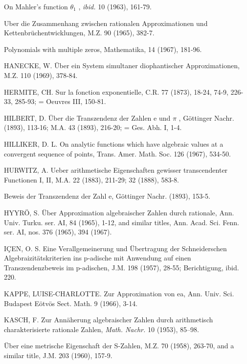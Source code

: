 \begin{hanglist}
    \item \hspace{1.5em} On Mahler's function  $\theta_1$ , \textit{ibid.} 10 (1963), 161-79.
    \item \hspace{1.5em} Uber die Zusammenhang zwischen rationalen Approximationen und Kettenbrüchentwicklungen, M.Z. 90 (1965), 382-7.
    \item Polynomials with multiple zeros, Mathematika, 14 (1967), 181-96.
    \item HANECKE, W. Über ein System simultaner diophantischer Approximationen, M.Z. 110 (1969), 378-84.
    \item HERMITE, CH. Sur la fonction exponentielle, C.R. 77 (1873), 18-24, 74-9, 226-33, 285-93; = Oeuvres III, 150-81.
    \item HILBERT, D. Über die Transzendenz der Zahlen e und  $\pi$ , Göttinger Nachr. (1893), 113-16; M.A. 43 (1893), 216-20; = Ges. Abh. I, 1-4.
    \item HILLIKER, D. L. On analytic functions which have algebraic values at a convergent sequence of points, Trans. Amer. Math. Soc. 126 (1967), 534-50.
    \item HURWITZ, A. Ueber arithmetische Eigenschaften gewisser transcendenter Functionen I, II, M.A. 22 (1883), 211-29; 32 (1888), 583-8.
    \item \hspace{1.5em} Beweis der Transzendenz der Zahl e, Göttinger Nachr. (1893), 153-5.
    \item HYYRÖ, S. Über Approximation algebraischer Zahlen durch rationale, Ann. Univ. Turku. ser. AI, 84 (1965), 1-12, and similar titles, Ann. Acad. Sci. Fenn. ser. AI, nos. 376 (1965), 394 (1967).
    \item IÇEN, O. S. Eine Verallgemeinerung und Übertragung der Schneiderschen Algebraizitätskriterien ins p-adische mit Anwendung auf einen Transzendenzbeweis im p-adischen, J.M. 198 (1957), 28-55; Berichtigung, ibid. 220.
    \item KAPPE, LUISE-CHARLOTTE. Zur Approximation von ea, Ann. Univ. Sci. Budapest Eötvös Sect. Math. 9 (1966), 3-14.
    \item KASCH, F. Zur Annäherung algebraischer Zahlen durch arithmetisch charakterisierte rationale Zahlen, \textit{Math. Nachr.} 10 (1953), 85–98.
    \item \hspace{1.5em} Über eine metrische Eigenschaft der S-Zahlen, M.Z. 70 (1958), 263-70, and a similar title, J.M. 203 (1960), 157-9.

\end{hanglist}
